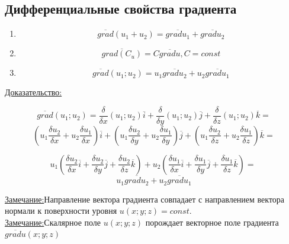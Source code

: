\documentclass[12pt]{article}
\begin{document}
  \subsection*{Дифференциальные свойства градиента}
  \begin{enumerate}
    \item \[\overline{grad}(u_1+u_2)=\overline{grad u_1}+\overline{grad u_2}\]
    \item \[\overline{grad(C_u)}=C\overline{grad u}, C=const\]
    \item \[\overline{grad}(u_1;u_2)=u_1\overline{grad u_2}+u_2\overline{grad u_1}\]
  \end{enumerate}
  \underline{Доказательство:}
  \begin{adjustwidth}{1.5em}{1.5em}
    \[\overline{grad}(u_1;u_2)=
    \frac{\delta}{\delta x}(u_1;u_2)\overline{i}+\frac{\delta}{\delta y}(u_1;u_2)\overline{j}+\frac{\delta}{\delta z}(u_1;u_2)\overline{k}=\]\[
    (u_1 \frac{\delta u_2}{\delta x}+u_2\frac{\delta u_1}{\delta x})\overline{i} + (u_1 \frac{\delta u_2}{\delta y}+u_2\frac{\delta u_1}{\delta y})\overline{j} + (u_1\frac{\delta u_2}{\delta z}+u_2\frac{\delta u_1}{\delta z})\overline{k}=\]
  
    \[u_1(\frac{\delta u_2}{\delta x}\overline{i} +\frac{\delta u_2}{\delta y}\overline{j}+\frac{\delta u_2}{\delta z}\overline{k})+
  u_2(\frac{\delta u_1}{\delta x}\overline{i} +\frac{\delta u_1}{\delta y}\overline{j}+\frac{\delta u_1}{\delta z}\overline{k})=\
  \]\[u_1 \overline{grad u_2}+u_2 \overline{grad u_1}\]
  \end{adjustwidth}
  \underline{Замечание:}Направление вектора градиента совпадает с направлением вектора нормали к поверхности уровня $u(x;y;z)=const.$\\
  \underline{Замечание:}Скалярное поле $u(x;y;z)$ порождает векторное поле градиента $\overline{grad u}(x;y;z)$
\end{document}
